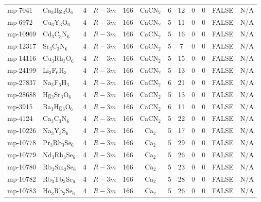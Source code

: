 {\begin{longtable}{llcccccccccc}
    mp-7041 & Ca$_{3}$Hg$_{3}$O$_{6}$ & 4     & $R-3m$ & 166   & CaCN$_{2}$ & 6     & 12    & 0     & 0     & FALSE & N/A \\
    mp-6972 & Cu$_{3}$Y$_{3}$O$_{6}$ & 4     & $R-3m$ & 166   & CaCN$_{2}$ & 5     & 11    & 0     & 0     & FALSE & N/A \\
    mp-10969 & Cd$_{3}$C$_{3}$N$_{6}$ & 4     & $R-3m$ & 166   & CaCN$_{2}$ & 5     & 16    & 0     & 0     & FALSE & N/A \\
    mp-12317 & Sr$_{3}$C$_{3}$N$_{6}$ & 4     & $R-3m$ & 166   & CaCN$_{2}$ & 5     & 7     & 0     & 0     & FALSE & N/A \\
    mp-14116 & Cu$_{3}$Rh$_{3}$O$_{6}$ & 4     & $R-3m$ & 166   & CaCN$_{2}$ & 5     & 15    & 0     & 0     & FALSE & N/A \\
    mp-24199 & Li$_{3}$F$_{6}$H$_{3}$ & 4     & $R-3m$ & 166   & CaCN$_{2}$ & 5     & 13    & 0     & 0     & FALSE & N/A \\
    mp-27837 & Na$_{3}$F$_{6}$H$_{3}$ & 4     & $R-3m$ & 166   & CaCN$_{2}$ & 6     & 21    & 0     & 0     & FALSE & N/A \\
    mp-28688 & Hg$_{3}$Sr$_{3}$O$_{6}$ & 4     & $R-3m$ & 166   & CaCN$_{2}$ & 5     & 13    & 0     & 0     & FALSE & N/A \\
    mp-3915 & Ba$_{3}$Hg$_{3}$O$_{6}$ & 4     & $R-3m$ & 166   & CaCN$_{2}$ & 6     & 11    & 0     & 0     & FALSE & N/A \\
    mp-4124 & Ca$_{3}$C$_{3}$N$_{6}$ & 4     & $R-3m$ & 166   & CaCN$_{2}$ & 5     & 22    & 0     & 0     & FALSE & N/A \\
    mp-10226 & Na$_{3}$Y$_{3}$S$_{6}$ & 4     & $R-3m$ & 166   & Ca$_{2}$ & 5     & 17    & 0     & 0     & FALSE & N/A \\
    mp-10778 & Pr$_{3}$Rb$_{3}$Se$_{6}$ & 4     & $R-3m$ & 166   & Ca$_{2}$ & 5     & 29    & 0     & 0     & FALSE & N/A \\
    mp-10779 & Nd$_{3}$Rb$_{3}$Se$_{6}$ & 4     & $R-3m$ & 166   & Ca$_{2}$ & 5     & 26    & 0     & 0     & FALSE & N/A \\
    mp-10780 & Rb$_{3}$Sm$_{3}$Se$_{6}$ & 4     & $R-3m$ & 166   & Ca$_{2}$ & 5     & 23    & 0     & 0     & FALSE & N/A \\
    mp-10782 & Rb$_{3}$Tb$_{3}$Se$_{6}$ & 4     & $R-3m$ & 166   & Ca$_{2}$ & 5     & 28    & 0     & 0     & FALSE & N/A \\
    mp-10783 & Ho$_{3}$Rb$_{3}$Se$_{6}$ & 4     & $R-3m$ & 166   & Ca$_{2}$ & 5     & 26    & 0     & 0     & FALSE & N/A \\

\end{longtable}}
